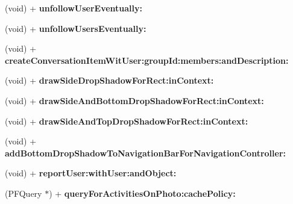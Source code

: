 \begin{DoxyCompactItemize}
\item 
\hypertarget{interface_e_s_utility_aaf29c96677f0a0e91e4b20fc5f35a52f}{}(void) + {\bfseries unfollow\+User\+Eventually\+:}\label{interface_e_s_utility_aaf29c96677f0a0e91e4b20fc5f35a52f}

\item 
\hypertarget{interface_e_s_utility_ac1b6381d490bf721c594541b3cc6df02}{}(void) + {\bfseries unfollow\+Users\+Eventually\+:}\label{interface_e_s_utility_ac1b6381d490bf721c594541b3cc6df02}

\item 
\hypertarget{interface_e_s_utility_a8076e13cebafb254599dbf6986b21e2e}{}(void) + {\bfseries create\+Conversation\+Item\+Wit\+User\+:group\+Id\+:members\+:and\+Description\+:}\label{interface_e_s_utility_a8076e13cebafb254599dbf6986b21e2e}

\item 
\hypertarget{interface_e_s_utility_a29eb1c3588c69c649f1b7eb3ae98d87e}{}(void) + {\bfseries draw\+Side\+Drop\+Shadow\+For\+Rect\+:in\+Context\+:}\label{interface_e_s_utility_a29eb1c3588c69c649f1b7eb3ae98d87e}

\item 
\hypertarget{interface_e_s_utility_ac9cca68347741a4cd550a62f9e5971a1}{}(void) + {\bfseries draw\+Side\+And\+Bottom\+Drop\+Shadow\+For\+Rect\+:in\+Context\+:}\label{interface_e_s_utility_ac9cca68347741a4cd550a62f9e5971a1}

\item 
\hypertarget{interface_e_s_utility_aca858f35ebafe957955cca8634c82694}{}(void) + {\bfseries draw\+Side\+And\+Top\+Drop\+Shadow\+For\+Rect\+:in\+Context\+:}\label{interface_e_s_utility_aca858f35ebafe957955cca8634c82694}

\item 
\hypertarget{interface_e_s_utility_a80df50b1f9736429409fd2fd988a0e29}{}(void) + {\bfseries add\+Bottom\+Drop\+Shadow\+To\+Navigation\+Bar\+For\+Navigation\+Controller\+:}\label{interface_e_s_utility_a80df50b1f9736429409fd2fd988a0e29}

\item 
\hypertarget{interface_e_s_utility_a0ea146997bd5f6c29507dbf6d286a478}{}(void) + {\bfseries report\+User\+:with\+User\+:and\+Object\+:}\label{interface_e_s_utility_a0ea146997bd5f6c29507dbf6d286a478}

\item 
\hypertarget{interface_e_s_utility_af3ac448f5f02e1ca2567a3e27803d6ac}{}(P\+F\+Query $\ast$) + {\bfseries query\+For\+Activities\+On\+Photo\+:cache\+Policy\+:}\label{interface_e_s_utility_af3ac448f5f02e1ca2567a3e27803d6ac}


\end{DoxyCompactItemize}
